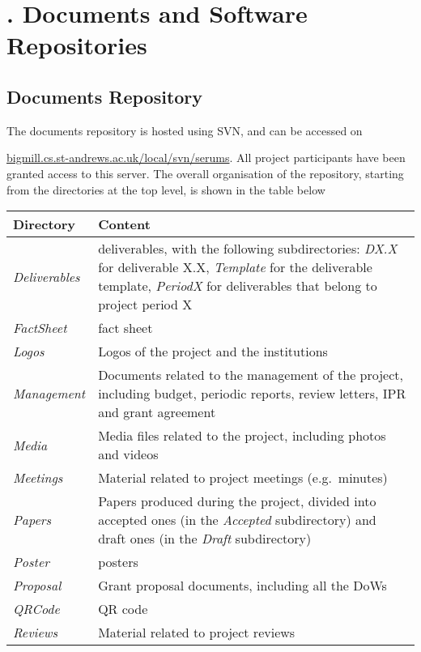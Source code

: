 \addtocounter{chapter}{1}
\setcounter{section}{0}
\setcounter{figure}{0}
\chapter*{\thechapter. Documents and Software Repositories}
\section{Documents Repository}

The documents repository is hosted using SVN, and can be accessed on

\url{bigmill.cs.st-andrews.ac.uk/local/svn/serums}.
\noindent
All project participants have
been granted access to this server. The overall organisation of the
repository, starting from the directories at the top level, is shown 
in the table below

\begin{tabular}{|p{2.5cm}|p{8.9cm}|}
\hline
\textbf{Directory} & \textbf{Content} \\
\hline \hline
\emph{Deliverables} & \Serums{} deliverables, with the following subdirectories: \emph{DX.X} for deliverable X.X, \emph{Template} for the deliverable template, \emph{PeriodX} for deliverables that belong to project period X \\
\hline
\emph{FactSheet} & \Serums{} fact sheet \\
\hline \emph{Logos} & Logos of the project and the institutions \\
\hline \emph{Management} & Documents related to the management of the project,
including budget, periodic reports, review letters, IPR and grant agreement \\
\hline \emph{Media} & Media files related to the project, including photos and videos \\
\hline \emph{Meetings} & Material related to project meetings (e.g.~minutes) \\
\hline \emph{Papers} & Papers produced during the project, divided into
accepted ones (in the \emph{Accepted} subdirectory) and draft ones (in the
\emph{Draft} subdirectory) \\
\hline \emph{Poster} & \Serums{} posters \\
\hline \emph{Proposal} & Grant proposal documents, including all the DoWs \\
\hline \emph{QRCode} & QR code \\
\hline \emph{Reviews} & Material related to project reviews \\
\hline
\end{tabular}

